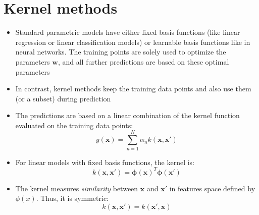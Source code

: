 \section{Kernel methods}
\begin{itemize}
	\item Standard parametric models have either fixed basis functions (like linear regression or linear classification models) or learnable basis functions like in neural networks. The training points are solely used to optimize the parameters $\bm{w}$, and all further predictions are based on these optimal parameters
	\item In contrast, kernel methods keep the training data points and also use them (or a subset) during prediction
	\item The predictions are based on a linear combination of the kernel function evaluated on the training data points:
	$$y(\bm{x}) = \sum\limits_{n=1}^{N} \alpha_n k\left(\bm{x}, \bm{x}'\right)$$
	\item For linear models with fixed basis functions, the kernel is:
	$$k(\bm{x},\bm{x}') = \bm{\phi}(\bm{x})^T\bm{\phi}(\bm{x}')$$
	\item The kernel measures \textit{similarity} between $\bm{x}$ and $\bm{x}'$ in features space defined by $\phi(x)$. Thus, it is symmetric: $$k(\bm{x},\bm{x}')=k(\bm{x}',\bm{x})$$
\end{itemize}
